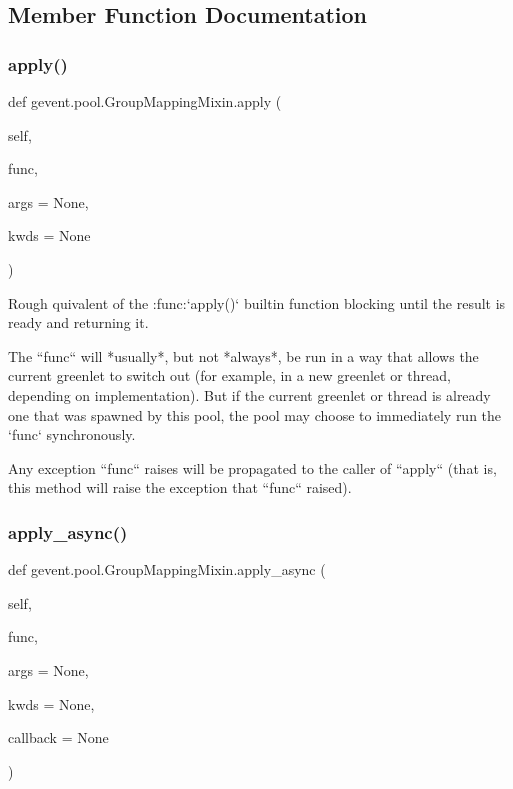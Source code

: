\subsection{Member Function Documentation}
\mbox{\label{classgevent_1_1pool_1_1_group_mapping_mixin_a041583aabc35041a8e43ccde41e574a2}} 
\subsubsection{\texorpdfstring{apply()}{apply()}}
{\footnotesize\ttfamily def gevent.\+pool.\+Group\+Mapping\+Mixin.\+apply (\begin{DoxyParamCaption}\item[{}]{self,  }\item[{}]{func,  }\item[{}]{args = {\ttfamily None},  }\item[{}]{kwds = {\ttfamily None} }\end{DoxyParamCaption})}

\begin{DoxyVerb}Rough quivalent of the :func:`apply()` builtin function blocking until
the result is ready and returning it.

The ``func`` will *usually*, but not *always*, be run in a way
that allows the current greenlet to switch out (for example,
in a new greenlet or thread, depending on implementation). But
if the current greenlet or thread is already one that was
spawned by this pool, the pool may choose to immediately run
the `func` synchronously.

Any exception ``func`` raises will be propagated to the caller of ``apply`` (that is,
this method will raise the exception that ``func`` raised).
\end{DoxyVerb}
 \mbox{\label{classgevent_1_1pool_1_1_group_mapping_mixin_a941dbbc427759802773477a43b800e6e}} 
\subsubsection{\texorpdfstring{apply\+\_\+async()}{apply\_async()}}
{\footnotesize\ttfamily def gevent.\+pool.\+Group\+Mapping\+Mixin.\+apply\+\_\+async (\begin{DoxyParamCaption}\item[{}]{self,  }\item[{}]{func,  }\item[{}]{args = {\ttfamily None},  }\item[{}]{kwds = {\ttfamily None},  }\item[{}]{callback = {\ttfamily None} }\end{DoxyParamCaption})}

